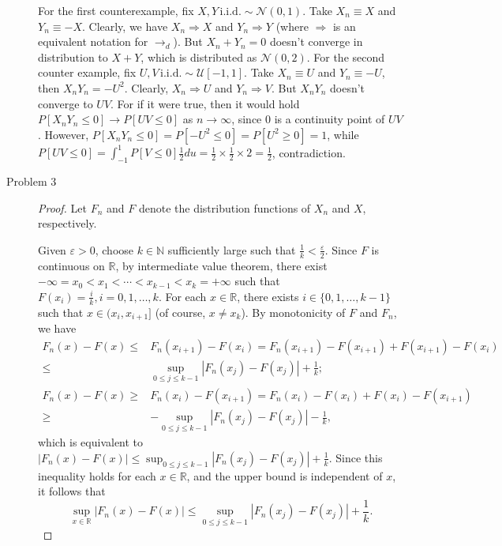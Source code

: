\documentclass{article}
\newcommand{\eps}{\varepsilon}
\newcommand{\real}{\mathbb{R}}
\newcommand{\nn}{\mathbb{N}}
\theoremstyle{definition}
\theoremstyle{plain}
\theoremstyle{remark}
\begin{document}
\begin{description}
For the first counterexample, fix $X, Y \,\text{i.i.d.}\sim \mathcal{N}(0, 1)$.  Take $X_n \equiv X$ and $Y_n \equiv -X$. Clearly, we have $X_n \Rightarrow X$ and $Y_n \Rightarrow Y$ (where $\Rightarrow$ is an equivalent notation for $\to_d$). But $X_n + Y_n = 0$ doesn't converge in distribution to $X + Y$, which is distributed as $\mathcal{N}(0, 2)$. For the second counter example, fix $U, V\, \text{i.i.d.}\sim \mathcal{U}[-1, 1]$. Take $X_n \equiv U$ and $Y_n \equiv -U$, then $X_nY_n = -U^2$. Clearly, $X_n \Rightarrow U$ and $Y_n \Rightarrow V$. But $X_nY_n$ doesn't converge to $UV$. For if it were true, then it would hold $P[X_nY_n \leq 0] \to P[UV \leq 0]$ as $n \to \infty$, since $0$ is a continuity point of $UV$. However, $P[X_nY_n \leq 0] = P[-U^2 \leq 0] = P[U^2 \geq 0] = 1$, while $P[UV \leq 0] = \int_{-1}^1 P[V \leq 0]\frac{1}{2}du = \frac{1}{2} \times \frac{1}{2} \times 2 = \frac{1}{2}$, contradiction.


\item[Problem 3]
\begin{proof}
Let $F_n$ and $F$ denote the distribution functions of $X_n$ and $X$, respectively.

Given $\eps > 0$, choose $k \in \nn$ sufficiently large such that $\frac{1}{k} < \frac{\eps}{2}$. Since $F$ is continuous on $\real$, by intermediate value theorem, there exist $-\infty = x_0 < x_1 < \cdots < x_{k - 1} < x_k = +\infty$ such that $F(x_i) = \frac{i}{k}, i = 0, 1, \ldots, k$. For each $x \in \real$, there exists $i \in \{0, 1, \ldots, k - 1\}$ such that $x \in (x_i, x_{i + 1}]$ (of course, $x \neq x_k$). By monotonicity of $F$ and $F_n$, we have
\begin{align*}
F_n(x) - F(x) \leq & F_n(x_{i + 1}) - F(x_i) = F_n(x_{i + 1}) - F(x_{i + 1}) + F(x_{i + 1}) - F(x_i) \\
\leq & \sup_{0 \leq j \leq k - 1}|F_n(x_j) - F(x_j)| + \frac{1}{k}; \\
F_n(x) - F(x) \geq & F_n(x_{i}) - F(x_{i + 1}) = F_n(x_i) - F(x_i) + F(x_i) -  F(x_{i + 1}) \\
\geq & -\!\sup_{0 \leq j \leq k - 1}|F_n(x_j) - F(x_j)| - \frac{1}{k},
\end{align*}
which is equivalent to $|F_n(x) - F(x)| \leq \sup_{0 \leq j \leq k - 1}|F_n(x_j) - F(x_j)| + \frac{1}{k}$. Since this inequality holds for each $x \in \real$, and the upper bound is independent of $x$, it follows that
$$\sup_{x \in \real}|F_n(x) - F(x)| \leq \sup_{0 \leq j \leq k - 1}|F_n(x_j) - F(x_j)| + \frac{1}{k}.$$


\end{proof}
\end{description}
\end{document}
